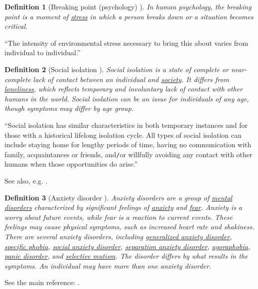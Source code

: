 \documentclass[12pt]{article}
\newtheorem{definition}{Definition}[section]
\begin{document}
\begin{definition}[Breaking point (psychology) \cite{Wikepedia/Breaking point (psychology)}]
	In human psychology, the \emph{breaking point} is a moment of \href{https://en.wikipedia.org/wiki/Stress_(medicine)}{stress} in which a person breaks down or a situation becomes critical.
\end{definition}
``The intensity of environmental stress necessary to bring this about varies from individual to individual.''

\begin{definition}[Social isolation \cite{Wikipedia/Social isolation}]
	\emph{Social isolation} is a state of complete or near-complete lack of contact between an individual and \href{https://en.wikipedia.org/wiki/Society}{society}. It differs from \href{https://en.wikipedia.org/wiki/Loneliness}{loneliness}, which reflects temporary and involuntary lack of contact with other humans in the world. Social isolation can be an issue for individuals of any age, though symptoms may differ by age group.
\end{definition}
``Social isolation has similar characteristics in both temporary instances and for those with a historical lifelong isolation cycle. All types of social isolation can include staying home for lengthy periods of time, having no communication with family, acquaintances or friends, and{\tt/}or willfully avoiding any contact with other humans when those opportunities do arise.''

See also, e.g. \cite{NASEM2020,NhuTrang2020}.

\begin{definition}[Anxiety disorder \cite{Wikipedia/Anxiety disorder}]
	\emph{Anxiety disorders} are a group of \href{https://en.wikipedia.org/wiki/Mental_disorder}{mental disorders} characterized by significant feelings of \href{https://en.wikipedia.org/wiki/Anxiety_(mood)}{anxiety} and \href{https://en.wikipedia.org/wiki/Fear}{fear}. Anxiety is a worry about future events, while fear is a reaction to current events. These feelings may cause physical symptoms, such as increased heart rate and shakiness. There are several anxiety disorders, including \href{https://en.wikipedia.org/wiki/Generalized_anxiety_disorder}{generalized anxiety disorder}, \href{https://en.wikipedia.org/wiki/Specific_phobia}{specific phobia}, \href{https://en.wikipedia.org/wiki/Social_anxiety_disorder}{social anxiety disorder}, \href{https://en.wikipedia.org/wiki/Separation_anxiety_disorder}{separation anxiety disorder}, \href{https://en.wikipedia.org/wiki/Agoraphobia}{agoraphobia}, \href{https://en.wikipedia.org/wiki/Panic_disorder}{panic disorder}, and \href{https://en.wikipedia.org/wiki/Selective_mutism}{selective mutism}. The disorder differs by what results in the symptoms. An individual may have more than one anxiety disorder.
\end{definition}
See the main reference: \cite{APA2013}.
\end{document}
